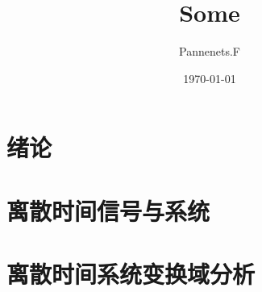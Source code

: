 \documentclass[en,11pt,english,black,simple,device=ppt]{elegantbook}
\title{Some}
\author{Pannenets.F}
\date{\today}
\begin{document}
\maketitle
\frontmatter


\mainmatter

\chapter{绪论}



\chapter{离散时间信号与系统}



\chapter{离散时间系统变换域分析}



\end{document}
